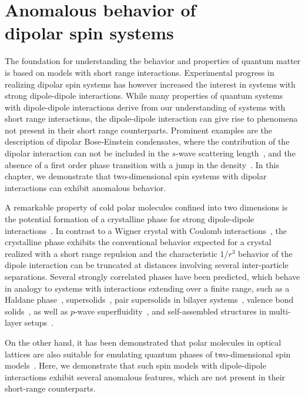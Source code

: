 \chapter[Anomalous behavior of dipolar spin systems]{Anomalous behavior of\texorpdfstring{\\}{ }dipolar spin systems}
\label{anomalous_behavior}

The foundation for understanding the behavior and properties of quantum matter is based on models with short range interactions.
Experimental progress in realizing dipolar spin systems has however increased the interest in systems with strong dipole-dipole interactions.
While many properties of quantum systems with dipole-dipole interactions derive from our understanding of systems with short range interactions, the dipole-dipole interaction can give rise to phenomena not present in their short range counterparts.
Prominent examples are the description of dipolar Bose-Einstein condensates, where the contribution of the dipolar interaction can not be included in the $s$-wave scattering length~\cite{Lahaye2009}, and the absence of a first order phase transition with a jump in the density~\cite{Spivak2004}.
In this chapter, we demonstrate that two-dimensional spin systems with dipolar interactions can exhibit anomalous behavior.

A remarkable property of cold polar molecules confined into two dimensions is the potential formation
of a crystalline phase for strong dipole-dipole interactions~\cite{Buchler2007,Astrakharchik2007}. In contrast to a Wigner crystal with Coulomb
interactions~\cite{Bonsall1977}, the crystalline phase exhibits the conventional behavior expected for a crystal realized with a
short range repulsion and the characteristic $1/r^3$ behavior of the dipole interaction can be truncated
at distances involving several inter-particle separations. Several strongly correlated phases have been predicted, which
behave in analogy to systems with interactions extending over a finite range, such as a Haldane phase~\cite{DallaTorre2006a}, supersolids~\cite{Pollet2010,Capogrosso-Sansone2010}, pair supersolids in
bilayer systems~\cite{Trefzger2009}, valence bond solids~\cite{Bonnes2010},
as well as $p$-wave superfluidity~\cite{Cooper2009}, and self-assembled structures in multi-layer setups~\cite{Wang2006}.

On the other hand, it has been demonstrated that polar molecules in optical
lattices are also suitable for emulating quantum phases of two-dimensional spin models~\cite{Micheli2006,Gorshkov2011,Gorshkov2011c}.
Here, we demonstrate that such spin models with dipole-dipole interactions exhibit several anomalous features, which are not present in their short-range counterparts.

